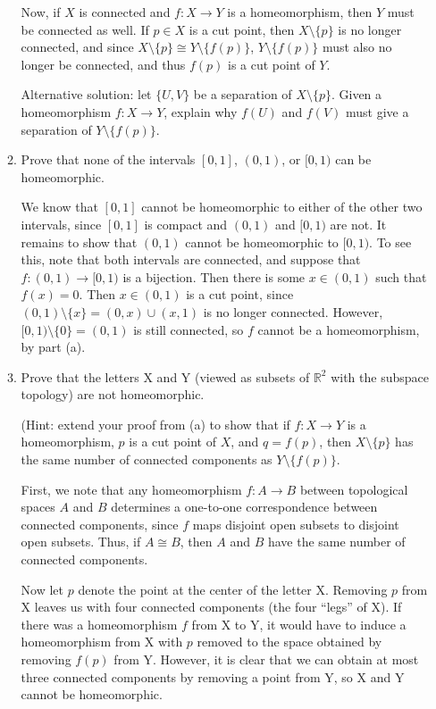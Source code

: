 \documentclass[letterpaper,12pt]{article}
\newcommand{\R}{\mathbb{R}}
\begin{document}
\begin{enumerate}
\begin{enumerate}
Now, if $X$ is connected and $f:X\to Y$ is a homeomorphism, then $Y$ must be connected as well. If $p\in X$ is a cut point, then $X\setminus\{p\}$ is no longer connected, and since $X\setminus\{p\}\cong Y\setminus\{f(p)\}$, $Y\setminus\{f(p)\}$ must also no longer be connected, and thus $f(p)$ is a cut point of $Y$.

\bigskip

Alternative solution: let $\{U,V\}$ be a separation of $X\setminus \{p\}$. Given a homeomorphism $f:X\to Y$, explain why $f(U)$ and $f(V)$ must give a separation of $Y\setminus\{f(p)\}$.

\bigskip

\item Prove that none of the intervals $[0,1]$, $(0,1)$, or $[0,1)$ can be homeomorphic. 

\bigskip

We know that $[0,1]$ cannot be homeomorphic to either of the other two intervals, since $[0,1]$ is compact and $(0,1)$ and $[0,1)$ are not. It remains to show that $(0,1)$ cannot be homeomorphic to $[0,1)$. To see this, note that both intervals are connected, and suppose that $f:(0,1)\to [0,1)$ is a bijection. Then there is some $x\in (0,1)$ such that $f(x)=0$. Then $x\in (0,1)$ is a cut point, since $(0,1)\setminus\{x\} = (0,x)\cup (x,1)$ is no longer connected. However, $[0,1)\setminus\{0\} = (0,1)$ is still connected, so $f$ cannot be a homeomorphism, by part (a).

\bigskip

\item Prove that the letters X and Y (viewed as subsets of $\R^2$ with the subspace topology) are not homeomorphic.

(Hint: extend your proof from (a) to show that if $f:X\to Y$ is a homeomorphism, $p$ is a cut point of $X$, and $q=f(p)$, then $X\setminus \{p\}$ has the same number of connected components as $Y\setminus \{f(p)\}$.

\bigskip

First, we note that any homeomorphism $f:A\to B$ between topological spaces $A$ and $B$ determines a one-to-one correspondence between connected components, since $f$ maps disjoint open subsets to disjoint open subsets. Thus, if $A\cong B$, then $A$ and $B$ have the same number of connected components.

Now let $p$ denote the point at the center of the letter X. Removing $p$ from X leaves us with four connected components (the four ``legs'' of X). If there was a homeomorphism $f$ from X to Y, it would have to induce a homeomorphism from X with $p$ removed to the space obtained by removing $f(p)$ from Y. However, it is clear that we can obtain at most three connected components by removing a point from Y, so X and Y cannot be homeomorphic.


\end{enumerate}
\end{enumerate}
\end{document}
